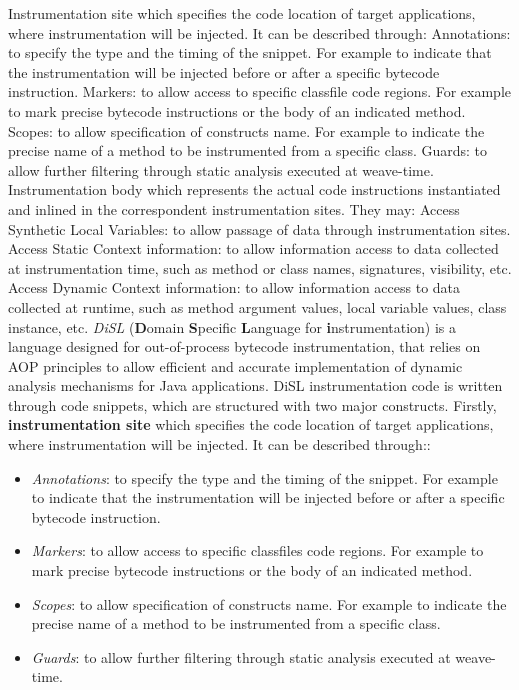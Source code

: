 \documentclass[]{usiinfthesis}
\begin{document}
Instrumentation site which specifies the code location of target applications, where instrumentation will be injected. It can be described through:
Annotations:  to specify the type and the timing of the snippet. For example to indicate that the instrumentation will be injected before or after a specific bytecode instruction.
Markers: to allow access to specific classfile code regions. For example to mark precise bytecode instructions or the body of an indicated method.
Scopes:  to allow specification of constructs name. For example to indicate the precise name of a method to be instrumented from a specific class.
Guards: to allow further filtering through static analysis executed at weave-time.
Instrumentation body which represents the actual code instructions instantiated and inlined in the correspondent instrumentation sites. They may:
Access Synthetic Local Variables: to allow passage of data through instrumentation sites.
Access Static Context information: to allow information access to data collected at instrumentation time, such as method or class names, signatures, visibility, etc.
Access Dynamic Context information: to allow information access to data collected at runtime, such as method argument values, local variable values, class instance, etc.
\textit{DiSL} (\textbf{D}omain \textbf{S}pecific \textbf{L}anguage for \textbf{i}nstrumentation) is a language designed for out-of-process bytecode instrumentation, that relies on AOP principles to allow efficient and accurate implementation of dynamic analysis mechanisms for Java applications. DiSL instrumentation code is written through code snippets, which are structured with two major constructs. Firstly, \textbf{instrumentation site} which specifies the code location of target applications, where instrumentation will be injected. It can be described through::
\begin{itemize}
    \item \textit{Annotations}: to specify the type and the timing of the snippet. For example to indicate that the instrumentation will be injected before or after a specific bytecode instruction.
    \item \textit{Markers}: to allow access to specific classfiles code regions. For example to mark precise bytecode instructions or the body of an indicated method.
    \item \textit{Scopes}: to allow specification of constructs name. For example to indicate the precise name of a method to be instrumented from a specific class. 
    \item \textit{Guards}: to allow further filtering through static analysis executed at weave-time.
\end{itemize}
\end{document}
